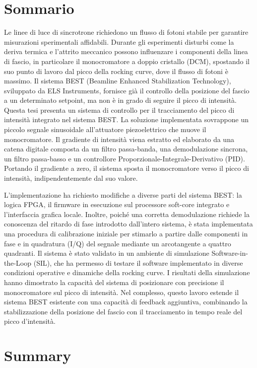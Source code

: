 \chapter{Sommario}

Le linee di luce di sincrotrone richiedono un flusso di fotoni stabile per garantire misurazioni sperimentali affidabili.
Durante gli esperimenti disturbi come la deriva termica e l'attrito meccanico possono influenzare i componenti della linea di fascio, in particolare il monocromatore a doppio cristallo (DCM), spostando il suo punto di lavoro dal picco della rocking curve, dove il flusso di fotoni è massimo.
Il sistema BEST (Beamline Enhanced Stabilization Technology), sviluppato da ELS Instruments, fornisce già il controllo della posizione del fascio a un determinato setpoint, ma non è in grado di seguire il picco di intensità.
Questa tesi presenta un sistema di controllo per il tracciamento del picco di intensità integrato nel sistema BEST.
La soluzione implementata sovrappone un piccolo segnale sinusoidale all'attuatore piezoelettrico che muove il monocromatore.
Il gradiente di intensità viena estratto ed elaborato da una catena digitale composta da un filtro passa-banda, una demodulazione sincrona, un filtro passa-basso e un controllore Proporzionale-Integrale-Derivativo (PID).
Portando il gradiente a zero, il sistema sposta il monocromatore verso il picco di intensità, indipendentemente dal suo valore.

L'implementazione ha richiesto modifiche a diverse parti del sistema BEST: la logica FPGA, il firmware in esecuzione sul processore soft-core integrato e l'interfaccia grafica locale.
Inoltre, poiché una corretta demodulazione richiede la conoscenza del ritardo di fase introdotto dall'intero sistema, è stata implementata una procedura di calibrazione iniziale per stimarlo a partire dalle componenti in fase e in quadratura (I/Q) del segnale mediante un arcotangente a quattro quadranti.
Il sistema è stato validato in un ambiente di simulazione Software-in-the-Loop (SIL), che ha permesso di testare il software implementato in diverse condizioni operative e dinamiche della rocking curve.
I risultati della simulazione hanno dimostrato la capacità del sistema di posizionare con precisione il monocromatore sul picco di intensità.
Nel complesso, questo lavoro estende il sistema BEST esistente con una capacità di feedback aggiuntiva, combinando la stabilizzazione della posizione del fascio con il tracciamento in tempo reale del picco d'intensità.

\chapter{Summary}

